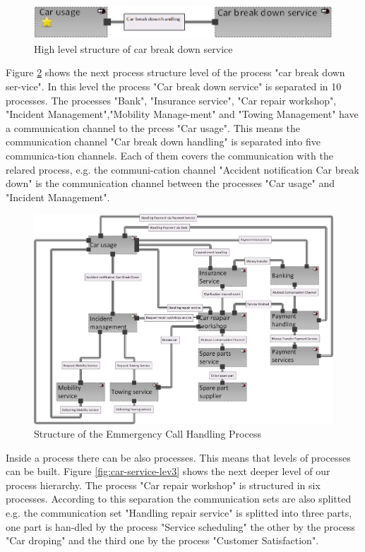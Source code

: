 \begin{figure}[htbp]
	\centering
	\includegraphics[width=0.7\linewidth]{Figures/Chapter5/figures-hierarchy/Car-Service-Level1.jpg}
	\caption[High level structure of car break down service]{High level structure of car break down service}
	\label{fig:car-service-level1}
\end{figure}



Figure \ref{fig:car-service-leve2} shows the next process structure level of the process "car break down ser-vice". In this level the process "Car break down service" is separated in 10 processes. The processes "Bank", "Insurance service", "Car repair workshop", "Incident Management","Mobility Manage-ment" and "Towing Management" have a communication channel to the prcess "Car usage". This means the communication channel "Car break down handling" is separated into five communica-tion channels. Each of them covers the communication with the relared process, e.g. the communi-cation channel "Accident notification Car break down" is the communication channel between the processes "Car usage" and "Incident Management".\\


\begin{figure}[htbp]
	\centering
	\includegraphics[width=0.8\linewidth]{Figures/Chapter5/figures-hierarchy/Car-Service-Leve2}
	\caption[Structure of the Emmergency Call Handling Process]{Structure of the Emmergency Call Handling Process}
	\label{fig:car-service-leve2}
\end{figure}



Inside a process there can be also processes. This means that levels of processes can be built. Figure \ref{fig:car-service-lev3} shows the next deeper level of our process hierarchy. The process "Car repair workshop" is structured in six processes. According to this separation the communication sets are also splitted e.g. the communication set "Handling repair service" is splitted into three parts, one part is han-dled by the process "Service scheduling" the other by the process "Car droping" and the third one by the process "Customer Satisfaction".\\

